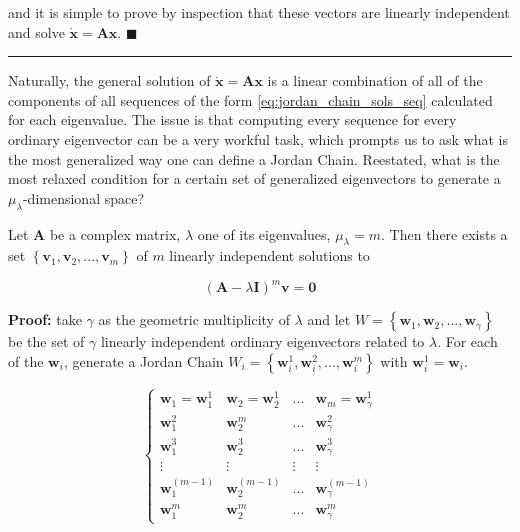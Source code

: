 	\noindent and it is simple to prove by inspection that these vectors are linearly independent and solve $\dot{\mathbf{x}} = \mathbf{Ax}$.
\hfill$\blacksquare$
\vspace{5mm}
\hrule
\vspace{5mm} %

	Naturally, the general solution of $\dot{\mathbf{x}} = \mathbf{Ax}$ is a linear combination of all of the components of all sequences of the form \eqref{eq:jordan_chain_sols_seq} calculated for each eigenvalue. The issue is that computing every sequence for every ordinary eigenvector can be a very workful task, which prompts us to ask what is the most generalized way one can define a Jordan Chain. Reestated, what is the most relaxed condition for a certain set of generalized eigenvectors to generate a $\mu_\lambda$-dimensional space?

\begin{theorem} \label{theo:jordan_group} %
	Let $\mathbf{A}$ be a complex matrix, $\lambda$ one of its eigenvalues, $\mu_\lambda = m$. Then there exists a set $\left\{\mathbf{v}_1,\mathbf{v}_2,...,\mathbf{v}_m\right\}$ of $m$ linearly independent solutions to

\begin{equation} \left(\mathbf{A} - \lambda\mathbf{I}\right)^m\mathbf{v} = \mathbf{0} \label{eq:jordain_chain_general_equation} \end{equation}

 \end{theorem}
\textbf{Proof: } take $\gamma$ as the geometric multiplicity of $\lambda$ and let $W = \left\{\mathbf{w}_1,\mathbf{w}_2,...,\mathbf{w}_\gamma\right\}$ be the set of $\gamma$ linearly independent ordinary eigenvectors related to $\lambda$. For each of the $\mathbf{w}_i$, generate a Jordan Chain $W_i = \left\{\mathbf{w}_i^1,\mathbf{w}_i^2,...,\mathbf{w}_i^m\right\}$ with $\mathbf{w}_i^1 = \mathbf{w}_i$.

\begin{equation}
\left\{\begin{array}{cccc}
	\mathbf{w}_1 = \mathbf{w}_1^1 &  \mathbf{w}_2 = \mathbf{w}_2^1 & ... & \mathbf{w}_m = \mathbf{w}_\gamma^1 \\[5mm]
	\mathbf{w}_1^2 & \mathbf{w}_2^{m} & ... & \mathbf{w}_\gamma^{2} \\[5mm]
	\mathbf{w}_1^{3} & \mathbf{w}_2^{3} & ... & \mathbf{w}_\gamma^{3} \\[5mm]
	\vdots & \vdots & \vdots & \vdots \\[5mm]
	\mathbf{w}_1^{(m-1)} & \mathbf{w}_2^{(m-1)} & ... & \mathbf{w}_\gamma^{(m-1)} \\[5mm]
	\mathbf{w}_1^{m} & \mathbf{w}_2^{m} & ... & \mathbf{w}_\gamma^{m}
\end{array}\right. \label{theo:generalized_jordan_chain_list}
\end{equation}

